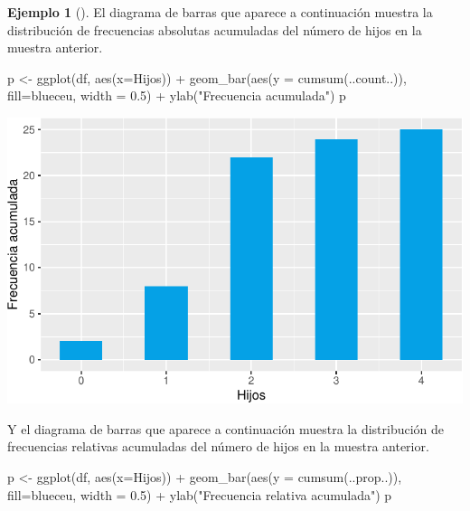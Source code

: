 \documentclass[
  a4paper,
]{scrreport}
\newenvironment{Shaded}{\begin{snugshade}}{\end{snugshade}}
\newcommand{\AttributeTok}[1]{\textcolor[rgb]{0.40,0.45,0.13}{#1}}
\newcommand{\FloatTok}[1]{\textcolor[rgb]{0.68,0.00,0.00}{#1}}
\newcommand{\FunctionTok}[1]{\textcolor[rgb]{0.28,0.35,0.67}{#1}}
\newcommand{\NormalTok}[1]{\textcolor[rgb]{0.00,0.23,0.31}{#1}}
\newcommand{\OtherTok}[1]{\textcolor[rgb]{0.00,0.23,0.31}{#1}}
\newcommand{\SpecialCharTok}[1]{\textcolor[rgb]{0.37,0.37,0.37}{#1}}
\newcommand{\StringTok}[1]{\textcolor[rgb]{0.13,0.47,0.30}{#1}}
\theoremstyle{plain}
\theoremstyle{definition}
\newtheorem{example}{Ejemplo}[chapter]
\theoremstyle{definition}
\theoremstyle{remark}
\begin{document}
\begin{example}[]
El diagrama de barras que aparece a continuación muestra la distribución
de frecuencias absolutas acumuladas del número de hijos en la muestra
anterior.

\begin{Shaded}
\begin{Highlighting}[]
\NormalTok{p }\OtherTok{\textless{}{-}} \FunctionTok{ggplot}\NormalTok{(df, }\FunctionTok{aes}\NormalTok{(}\AttributeTok{x=}\NormalTok{Hijos)) }\SpecialCharTok{+} 
    \FunctionTok{geom\_bar}\NormalTok{(}\FunctionTok{aes}\NormalTok{(}\AttributeTok{y =} \FunctionTok{cumsum}\NormalTok{(..count..)), }\AttributeTok{fill=}\NormalTok{blueceu, }\AttributeTok{width =} \FloatTok{0.5}\NormalTok{) }\SpecialCharTok{+}
    \FunctionTok{ylab}\NormalTok{(}\StringTok{"Frecuencia acumulada"}\NormalTok{)}
\NormalTok{p}
\end{Highlighting}
\end{Shaded}

\includegraphics{02-estadistica-descriptiva_files/figure-pdf/diagrama-barras-acumuladas-1.pdf}

Y el diagrama de barras que aparece a continuación muestra la
distribución de frecuencias relativas acumuladas del número de hijos en
la muestra anterior.

\begin{Shaded}
\begin{Highlighting}[]
\NormalTok{p }\OtherTok{\textless{}{-}} \FunctionTok{ggplot}\NormalTok{(df, }\FunctionTok{aes}\NormalTok{(}\AttributeTok{x=}\NormalTok{Hijos)) }\SpecialCharTok{+} 
    \FunctionTok{geom\_bar}\NormalTok{(}\FunctionTok{aes}\NormalTok{(}\AttributeTok{y =} \FunctionTok{cumsum}\NormalTok{(..prop..)), }\AttributeTok{fill=}\NormalTok{blueceu, }\AttributeTok{width =} \FloatTok{0.5}\NormalTok{) }\SpecialCharTok{+}
    \FunctionTok{ylab}\NormalTok{(}\StringTok{"Frecuencia relativa acumulada"}\NormalTok{)}
\NormalTok{p}
\end{Highlighting}
\end{Shaded}


\end{example}
\end{document}
